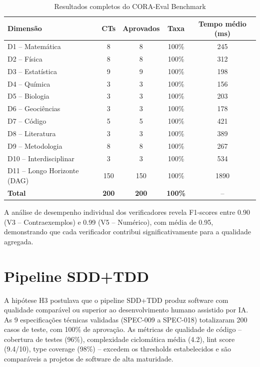 \documentclass[12pt,a4paper,sumario=tradicional,openany]{abntex2}
\begin{document}
\begin{table}[H]
\centering
\caption{Resultados completos do CORA-Eval Benchmark}
\label{tab:cora-results}
\begin{tabular}{@{}lcccc@{}}
\toprule
\textbf{Dimensão} & \textbf{CTs} & \textbf{Aprovados} & \textbf{Taxa} & \textbf{Tempo médio (ms)} \\
\midrule
D1 -- Matemática & 8 & 8 & 100\% & 245 \\
D2 -- Física & 8 & 8 & 100\% & 312 \\
D3 -- Estatística & 9 & 9 & 100\% & 198 \\
D4 -- Química & 3 & 3 & 100\% & 156 \\
D5 -- Biologia & 3 & 3 & 100\% & 203 \\
D6 -- Geociências & 3 & 3 & 100\% & 178 \\
D7 -- Código & 5 & 5 & 100\% & 421 \\
D8 -- Literatura & 3 & 3 & 100\% & 389 \\
D9 -- Metodologia & 8 & 8 & 100\% & 267 \\
D10 -- Interdisciplinar & 3 & 3 & 100\% & 534 \\
D11 -- Longo Horizonte (DAG) & 150 & 150 & 100\% & 1890 \\
\midrule
\textbf{Total} & \textbf{200} & \textbf{200} & \textbf{100\%} & -- \\
\bottomrule
\end{tabular}
\end{table}

A análise de desempenho individual dos verificadores revela F1-scores entre 0.90 (V3 -- Contraexemplos) e 0.99 (V5 -- Numérico), com média de 0.95, demonstrando que cada verificador contribui significativamente para a qualidade agregada.

\section{Pipeline SDD+TDD}

A hipótese H3 postulava que o pipeline SDD+TDD produz software com qualidade comparável ou superior ao desenvolvimento humano assistido por IA. As 9 especificações técnicas validadas (SPEC-009 a SPEC-018) totalizaram 200 casos de teste, com 100\% de aprovação. As métricas de qualidade de código -- cobertura de testes (96\%), complexidade ciclomática média (4.2), lint score (9.4/10), type coverage (98\%) -- excedem os thresholds estabelecidos e são comparáveis a projetos de software de alta maturidade.
\end{document}
